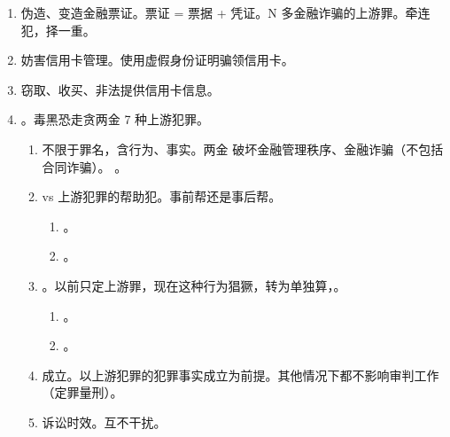 \begin{enumerate}
\begin{enumerate}
\begin{enumerate}
                \end{enumerate}
          \item 伪造、变造金融票证。\yi 票证 = 票据 + 凭证。\er N 多金融诈骗的上游罪。牵连犯，择一重。
          \item 妨害信用卡管理。使用虚假身份证明骗领信用卡。
          \item 窃取、收买、非法提供信用卡信息。
          \item {}。毒黑恐走贪两金 7 种上游犯罪。
                \begin{enumerate}
                  \item 不限于罪名，含行为、事实。两金 \yjt 破坏金融管理秩序、金融诈骗（不包括合同诈骗）。
                        。
                  \item vs 上游犯罪的帮助犯。事前帮还是事后帮。
                        \begin{enumerate}
                          \item {}。
                          \item {}。
                        \end{enumerate}
                  \item {}。以前只定上游罪，现在这种行为猖獗，转为单独算，。
                        \begin{enumerate}
                          \item {}。
                          \item {}。
                        \end{enumerate}
                  \item 成立。以上游犯罪的犯罪事实成立为前提。其他情况下都不影响审判工作（定罪量刑）。
                  \item 诉讼时效。互不干扰。
                \end{enumerate}
        \end{enumerate}
\end{enumerate}
